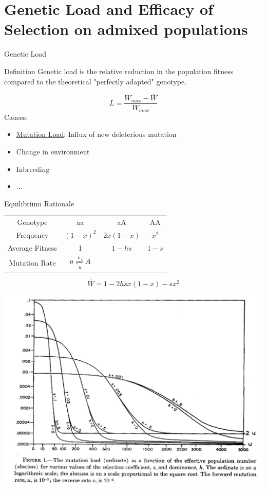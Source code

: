 \documentclass[10pt]{beamer}
\begin{document}
\section{Genetic Load and Efficacy of Selection on admixed populations}

\begin{frame}{Genetic Load}
  \begin{alertblock}{Definition}
    Genetic load is the relative reduction in the population fitness compared
    to the theoretical "perfectly adapted" genotype.
  \end{alertblock}
  \[
    L = \frac{W_{max} - \overline W}{W_{max}}
  \]
  Causes:
  \begin{itemize}
    \item \underline{Mutation Load}: Influx of new deleterious mutation
    \item Change in environment
    \item Inbreeding 
    \item ...
  \end{itemize}
\end{frame}

\begin{frame}{Equilibrium Rationale}

\begin{minipage}{0.7\textwidth}
  \centering
  \begin{footnotesize}
    \begin{tabular}{cccc}
      \hline
      Genotype & aa & aA & AA \\
      Frequency & $(1 - x) ^2$ & $2 x ( 1 - x)$ & $x^2$ \\
      Average Fitness & 1 & $1 - h s$ & $1 - s$ \\
      Mutation Rate & $ a \xrightleftharpoons[u]{v} A $ & \\
      \hline
    \end{tabular}

  \[
    \overline W = 1 - 2 hs x(1 -x) - s x^2
  \]
  \end{footnotesize}
  \includegraphics[width=\textwidth]{./Figures/Kimura_1963.png}
\end{minipage}
\end{frame}
\end{document}
